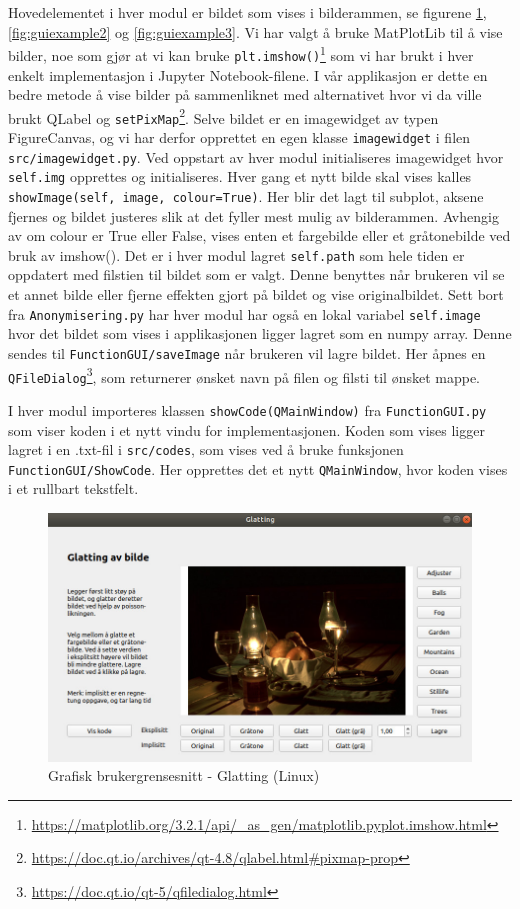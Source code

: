 Hovedelementet i hver modul er bildet som vises i bilderammen, se figurene \ref{fig:guiexample}, \ref{fig:guiexample2} og \ref{fig:guiexample3}. Vi har valgt å bruke MatPlotLib til å vise bilder, noe som gjør at vi kan bruke \texttt{plt.imshow()}\footnote{\url{https://matplotlib.org/3.2.1/api/_as_gen/matplotlib.pyplot.imshow.html}} som vi har brukt i hver enkelt implementasjon i Jupyter Notebook-filene. I vår applikasjon er dette en bedre metode å vise bilder på sammenliknet med alternativet hvor vi da ville brukt QLabel og \texttt{setPixMap}\footnote{\url{https://doc.qt.io/archives/qt-4.8/qlabel.html\#pixmap-prop}}. Selve bildet er en imagewidget av typen FigureCanvas, og vi har derfor opprettet en egen klasse \texttt {imagewidget} i filen \texttt{src/imagewidget.py}. Ved oppstart av hver modul initialiseres imagewidget hvor \texttt{self.img} opprettes og initialiseres. Hver gang et nytt bilde skal vises kalles \texttt{showImage(self, image, colour=True)}. Her blir det lagt til subplot, aksene fjernes og bildet justeres slik at det fyller mest mulig av bilderammen. Avhengig av om colour er True eller False, vises enten et fargebilde eller et gråtonebilde ved bruk av imshow(). Det er i hver modul lagret \texttt{self.path} som hele tiden er oppdatert med filstien til bildet som er valgt. Denne benyttes når brukeren vil se et annet bilde eller fjerne effekten gjort på bildet og vise originalbildet. Sett bort fra \texttt{Anonymisering.py} har hver modul har også en lokal variabel \texttt{self.image} hvor det bildet som vises i applikasjonen ligger lagret som en numpy array. Denne sendes til \texttt{FunctionGUI/saveImage} når brukeren vil lagre bildet. Her åpnes en \texttt{QFileDialog}\footnote{\url{https://doc.qt.io/qt-5/qfiledialog.html}}, som returnerer ønsket navn på filen og filsti til ønsket mappe.

I hver modul importeres klassen \texttt{showCode(QMainWindow)} fra \texttt{FunctionGUI.py} som viser koden i et nytt vindu for implementasjonen. Koden som vises ligger lagret i en .txt-fil i \texttt{src/codes}, som vises ved å bruke funksjonen \texttt{FunctionGUI/ShowCode}. Her opprettes det et nytt \texttt{QMainWindow}, hvor koden vises i et rullbart tekstfelt. 
\\[1cm]
\begin{figure}[H]
\begin{center}
    \includegraphics[width=0.9\columnwidth]{bilder/Gui/guiexample.jpg}
     \caption{Grafisk brukergrensesnitt - Glatting (Linux) \label{fig:guiexample}}
\end{center}
\end{figure}
\newpage
